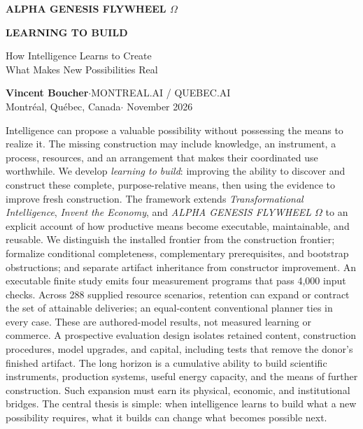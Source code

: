 \documentclass[11pt,letterpaper]{article}
\theoremstyle{remark}\newtheorem{remark}{Remark}[section]
\newcommand{\smallhead}[1]{\par\smallskip{\sffamily\bfseries\color{Gold}#1}\par\smallskip}
\begin{document}

\setcounter{page}{1}
\begin{center}
{\small\sffamily\bfseries\color{Gold}ALPHA GENESIS FLYWHEEL $\Omega$}\par\vspace{.12in}
{\LARGE\bfseries\color{Plum}LEARNING TO BUILD}\par\vspace{.1in}
{\Large How Intelligence Learns to Create\\What Makes New Possibilities Real}\par\vspace{.16in}
\textbf{Vincent Boucher}\quad$\cdot$\quad MONTREAL.AI / QUEBEC.AI\\
{\small Montr\'{e}al, Qu\'{e}bec, Canada\quad$\cdot$ November 2026}
\end{center}
\smallhead{ABSTRACT}
Intelligence can propose a valuable possibility without possessing the means to realize it. The missing construction may include knowledge, an instrument, a process, resources, and an arrangement that makes their coordinated use worthwhile. We develop \emph{learning to build}: improving the ability to discover and construct these complete, purpose-relative means, then using the evidence to improve fresh construction. The framework extends \emph{Transformational Intelligence}, \emph{Invent the Economy}, and \emph{ALPHA GENESIS FLYWHEEL $\Omega$} to an explicit account of how productive means become executable, maintainable, and reusable. We distinguish the installed frontier from the construction frontier; formalize conditional completeness, complementary prerequisites, and bootstrap obstructions; and separate artifact inheritance from constructor improvement. An executable finite study emits four measurement programs that pass 4,000 input checks. Across 288 supplied resource scenarios, retention can expand or contract the set of attainable deliveries; an equal-content conventional planner ties in every case. These are authored-model results, not measured learning or commerce. A prospective evaluation design isolates retained content, construction procedures, model upgrades, and capital, including tests that remove the donor's finished artifact. The long horizon is a cumulative ability to build scientific instruments, production systems, useful energy capacity, and the means of further construction. Such expansion must earn its physical, economic, and institutional bridges. The central thesis is simple: when intelligence learns to build what a new possibility requires, what it builds can change what becomes possible next.
\end{document}
